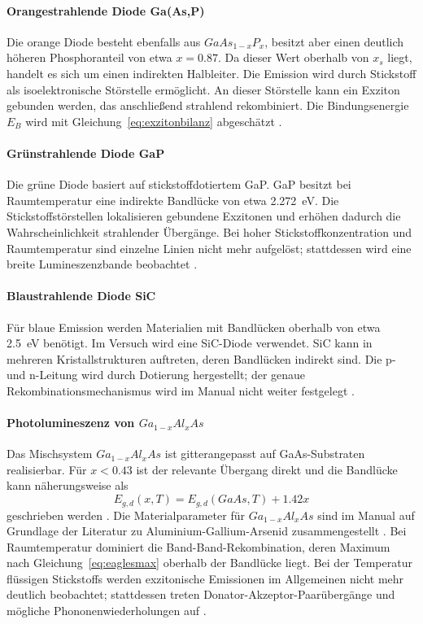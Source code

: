 \documentclass{article}
\begin{document}
\paragraph{Orangestrahlende Diode Ga(As,P)}
Die orange Diode besteht ebenfalls aus $GaAs_{1-x}P_x$, besitzt aber einen deutlich höheren Phosphoranteil von etwa $x=0.87$. Da dieser Wert oberhalb von $x_s$ liegt, handelt es sich um einen indirekten Halbleiter. Die Emission wird durch Stickstoff als isoelektronische Störstelle ermöglicht. An dieser Störstelle kann ein Exziton gebunden werden, das anschließend strahlend rekombiniert. Die Bindungsenergie $E_B$ wird mit Gleichung~\eqref{eq:exzitonbilanz} abgeschätzt \cite[S.~21]{manual}.

\paragraph{Grünstrahlende Diode GaP}
Die grüne Diode basiert auf stickstoffdotiertem GaP. GaP besitzt bei Raumtemperatur eine indirekte Bandlücke von etwa \SI{2.272}{\electronvolt}. Die Stickstoffstörstellen lokalisieren gebundene Exzitonen und erhöhen dadurch die Wahrscheinlichkeit strahlender Übergänge. Bei hoher Stickstoffkonzentration und Raumtemperatur sind einzelne Linien nicht mehr aufgelöst; stattdessen wird eine breite Lumineszenzbande beobachtet \cite[S.~22--23]{manual}.

\paragraph{Blaustrahlende Diode SiC}
Für blaue Emission werden Materialien mit Bandlücken oberhalb von etwa \SI{2.5}{\electronvolt} benötigt. Im Versuch wird eine SiC-Diode verwendet. SiC kann in mehreren Kristallstrukturen auftreten, deren Bandlücken indirekt sind. Die p- und n-Leitung wird durch Dotierung hergestellt; der genaue Rekombinationsmechanismus wird im Manual nicht weiter festgelegt \cite[S.~23]{manual}.

\paragraph{Photolumineszenz von $Ga_{1-x}Al_xAs$}
Das Mischsystem $Ga_{1-x}Al_xAs$ ist gitterangepasst auf GaAs-Substraten realisierbar. Für $x<0.43$ ist der relevante Übergang direkt und die Bandlücke kann näherungsweise als
\begin{equation}
    E_{g,d}(x,T)=E_{g,d}(GaAs,T)+1.42x
    \label{eq:gaalas}
\end{equation}
geschrieben werden \cite[S.~23--26, Tabelle~2]{manual}. Die Materialparameter für $Ga_{1-x}Al_xAs$ sind im Manual auf Grundlage der Literatur zu Aluminium-Gallium-Arsenid zusammengestellt \cite{adachi1993}. Bei Raumtemperatur dominiert die Band-Band-Rekombination, deren Maximum nach Gleichung~\eqref{eq:eaglesmax} oberhalb der Bandlücke liegt. Bei der Temperatur flüssigen Stickstoffs werden exzitonische Emissionen im Allgemeinen nicht mehr deutlich beobachtet; stattdessen treten Donator-Akzeptor-Paarübergänge und mögliche Phononenwiederholungen auf \cite[S.~24--26]{manual}.
\end{document}
